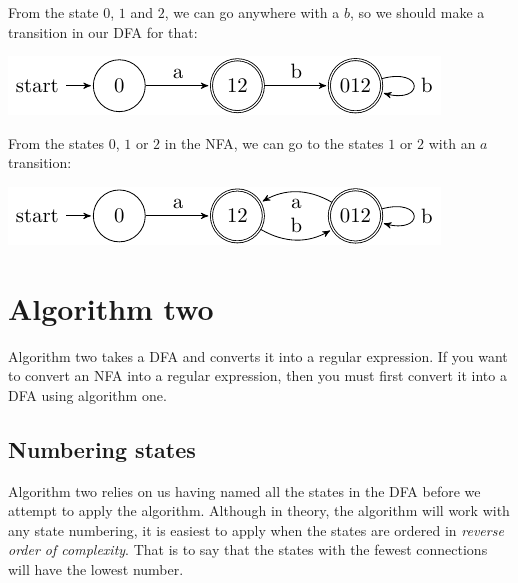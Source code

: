 From the state $0$, $1$ and $2$, we can go anywhere with a $b$, so we should
make a transition in our DFA for that:

\begin{center}
  \includegraphics{automata/9.pdf}
\end{center}

From the states $0$, $1$ or $2$ in the NFA, we can go to the states $1$ or $2$
with an $a$ transition:

\begin{center}
  \includegraphics{automata/10.pdf}
\end{center}


\section{Algorithm two}

Algorithm two takes a DFA and converts it into a regular expression. If you want
to convert an NFA into a regular expression, then you must first convert it into
a DFA using algorithm one.

\subsection{Numbering states}

Algorithm two relies on us having named all the states in the DFA before we
attempt to apply the algorithm. Although in theory, the algorithm will work with
any state numbering, it is easiest to apply when the states are ordered in {\it
reverse order of complexity}. That is to say that the states with the fewest
connections will have the lowest number.


